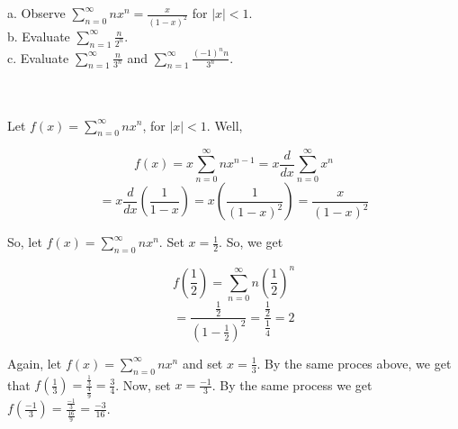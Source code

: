 a. Observe $\sum_{n=0}^{\infty}nx^n=\frac{x}{(1-x)^2}$ for $|x|<1$.\\

b. Evaluate $\sum_{n=1}^{\infty}\frac{n}{2^n}$.\\

c. Evaluate $\sum_{n=1}^{\infty}\frac{n}{3^n}$ and $\sum_{n=1}^{\infty}\frac{(-1)^nn}{3^n}$.\\\\

\begin{solution}\renewcommand{\qedsymbol}{}\ \\
    Let $f(x)=\sum_{n=0}^{\infty}nx^n$, for $|x|<1$. Well,
    
    $$f(x)=x\sum_{n=0}^{\infty}nx^{n-1}=x\frac{d}{dx}\sum_{n=0}^{\infty}x^n$$
    $$=x\frac{d}{dx}(\frac{1}{1-x})=x(\frac{1}{(1-x)^2})=\frac{x}{(1-x)^2}$$

    So, let $f(x)=\sum_{n=0}^{\infty}nx^n$. Set $x=\frac12$. So, we get
    
    $$f(\frac12)=\sum_{n=0}^{\infty}n(\frac12)^n$$
    $$=\frac{\frac12}{(1-\frac12)^2}=\frac{\frac12}{\frac14}=2$$

    Again, let $f(x)=\sum_{n=0}^{\infty}nx^n$ and set $x=\frac13$. By the same proces above, we get that
    $f(\frac13)=\frac{\frac13}{\frac49}=\frac34$. Now, set $x=\frac{-1}{3}$. By the same process we get
    $f(\frac{-1}{3})=\frac{\frac{-1}{3}}{\frac{16}{9}}=\frac{-3}{16}$.

\end{solution}